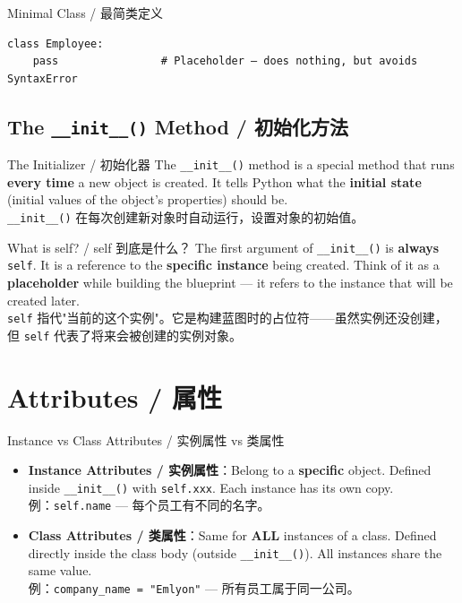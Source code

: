 \documentclass[11pt,a4paper]{report}
\let\oldtexttt\texttt
\renewcommand{\texttt}[1]{\textcolor{mainblue}{\oldtexttt{#1}}}
\begin{document}
\begin{examplebox}{Minimal Class / 最简类定义}
\begin{lstlisting}
class Employee:
    pass                # Placeholder — does nothing, but avoids SyntaxError
\end{lstlisting}
\end{examplebox}

\subsection{The \texttt{\_\_init\_\_()} Method / 初始化方法}

\begin{concept}{The Initializer / 初始化器}
    The \texttt{\_\_init\_\_()} method is a special method that runs \textbf{every time} a new object is created. It tells Python what the \textbf{initial state} (initial values of the object's properties) should be. \\
    \texttt{\_\_init\_\_()} 在每次创建新对象时自动运行，设置对象的初始值。
\end{concept}

\begin{warning}{What is self? / self 到底是什么？}
    The first argument of \texttt{\_\_init\_\_()} is \textbf{always} \texttt{self}. It is a reference to the \textbf{specific instance} being created. Think of it as a \textbf{placeholder} while building the blueprint — it refers to the instance that will be created later. \\
    \texttt{self} 指代"当前的这个实例"。它是构建蓝图时的占位符——虽然实例还没创建，但 \texttt{self} 代表了将来会被创建的实例对象。
\end{warning}

\section{Attributes / 属性}

\begin{concept}{Instance vs Class Attributes / 实例属性 vs 类属性}
    \begin{itemize}[itemsep=0.8em]
        \item \textbf{Instance Attributes / 实例属性}：Belong to a \textbf{specific} object. Defined inside \texttt{\_\_init\_\_()} with \texttt{self.xxx}. Each instance has its own copy. \\
        例：\texttt{self.name} — 每个员工有不同的名字。
        \item \textbf{Class Attributes / 类属性}：Same for \textbf{ALL} instances of a class. Defined directly inside the class body (outside \texttt{\_\_init\_\_()}). All instances share the same value. \\
        例：\texttt{company\_name = "Emlyon"} — 所有员工属于同一公司。
    \end{itemize}
\end{concept}
\end{document}
